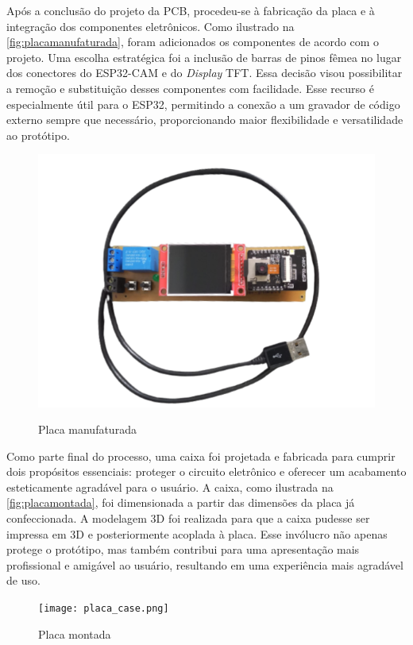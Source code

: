 Após a conclusão do projeto da PCB, procedeu-se à fabricação da placa e 
à integração dos componentes eletrônicos. Como ilustrado na \autoref{fig:placamanufaturada}, 
foram adicionados os componentes de acordo com o projeto. Uma escolha 
estratégica foi a inclusão de barras de pinos fêmea no lugar dos 
conectores do ESP32-CAM e do \textit{Display} TFT. Essa decisão visou 
possibilitar a remoção e substituição desses componentes com 
facilidade. Esse recurso é especialmente útil para o ESP32, 
permitindo a conexão a um gravador de código externo sempre 
que necessário, proporcionando maior flexibilidade e 
versatilidade ao protótipo.

\begin{figure}[h!]
    \centering
    \caption{Placa manufaturada}
    \includegraphics[scale=0.35]{figuras/placa_montada.png}
    \fonte{}%
    \label{fig:placamanufaturada}
    \centering
\end{figure}

Como parte final do processo, uma caixa foi projetada e fabricada para cumprir 
dois propósitos essenciais: proteger o circuito eletrônico e oferecer um 
acabamento esteticamente agradável para o usuário. A caixa, como ilustrada 
na \autoref{fig:placamontada}, foi dimensionada a partir das dimensões da placa 
já confeccionada. A modelagem 3D foi realizada para que a caixa pudesse 
ser impressa em 3D e posteriormente acoplada à placa. Esse invólucro 
não apenas protege o protótipo, mas também contribui para uma 
apresentação mais profissional e amigável ao usuário, resultando em 
uma experiência mais agradável de uso.

\begin{figure}[h!]
    \centering
    \caption{Placa montada}
    \texttt{[image: placa\_case.png]}
    \fonte{}%
    \label{fig:placamontada}
    \centering
\end{figure}